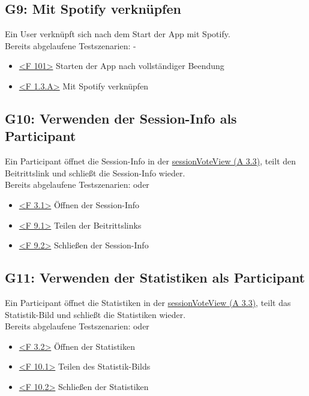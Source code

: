 \documentclass[oneside, ngerman]{sdqtechreport}
\begin{document}
\subsection{G9: Mit Spotify verknüpfen}
\label{subsec:Tests:GrundlegendeTestszenarien:G9}
\hypertarget{G9}{}
\renewcommand{\gNine}{\hyperlink{G9}{G9: Mit Spotify verknüpfen }}
Ein User verknüpft sich nach dem Start der App mit Spotify. \\
Bereits abgelaufene Testszenarien: -
\begin{itemize}
    \item \hyperlink{<F 101>}{<F 101>} Starten der App nach vollständiger Beendung
    \item \hyperlink{<F 1.3.A>}{<F 1.3.A>} Mit Spotify verknüpfen
\end{itemize}


\subsection{G10: Verwenden der Session-Info als Participant}
\label{subsec:Tests:GrundlegendeTestszenarien:G10}
\hypertarget{G10}{}
\newcommand{\gTen}{\hyperlink{G10}{G10: Verwenden der Session-Info als Participant }}
Ein Participant öffnet die Session-Info in der \hyperlink{sessionVoteView}{sessionVoteView (A 3.3)}, teilt den Beitrittslink und schließt die Session-Info wieder. \\
Bereits abgelaufene Testszenarien: \gTwo oder \gThree
\begin{itemize}
    \item \hyperlink{<F 3.1>}{<F 3.1>} Öffnen der Session-Info
    \item \hyperlink{<F 9.1>}{<F 9.1>} Teilen der Beitrittslinks
    \item \hyperlink{<F 9.2>}{<F 9.2>} Schließen der Session-Info
\end{itemize}


\subsection{G11: Verwenden der Statistiken als Participant}
\label{subsec:Tests:GrundlegendeTestszenarien:G11}
\hypertarget{G11}{}
\newcommand{\gEleven}{\hyperlink{G11}{G11: Verwenden der Statistiken als Participant }}
Ein Participant öffnet die Statistiken in der \hyperlink{sessionVoteView}{sessionVoteView (A 3.3)}, teilt das Statistik-Bild und schließt die Statistiken wieder. \\
Bereits abgelaufene Testszenarien: \gTwo oder \gThree
\begin{itemize}
    \item \hyperlink{<F 3.2>}{<F 3.2>} Öffnen der Statistiken
    \item \hyperlink{<F 10.1>}{<F 10.1>} Teilen des Statistik-Bilds
    \item \hyperlink{<F 10.2>}{<F 10.2>} Schließen der Statistiken
\end{itemize}
\end{document}
